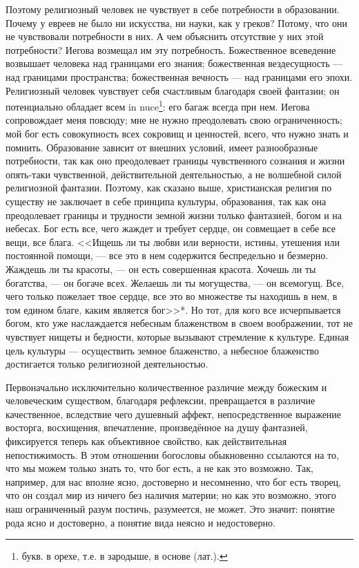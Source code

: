 \documentclass[12pt,oneside]{book}
\begin{document}
Поэтому религиозный человек не чувствует в себе потребности в образовании. Почему у евреев не было ни искусства, ни науки, как у греков? Потому, что они не чувствовали потребности в них. А чем объяснить отсутствие у них этой потребности? Иегова возмещал им эту потребность. Божественное всеведение возвышает человека над границами его знания\ddag\let\svthefootnote\thefootnote\let\thefootnote\relax{}\let\thefootnote\svthefootnote; божественная вездесущность --- над границами пространства; божественная вечность --- над границами его эпохи. Религиозный человек чувствует себя счастливым благодаря своей фантазии; он потенциально обладает всем in nuce\footnote{букв. в орехе, т.е. в зародыше, в основе (лат.).}: его багаж всегда при нем. Иегова сопровождает меня повсюду; мне не нужно преодолевать свою ограниченность; мой бог есть совокупность всех сокровищ и ценностей, всего, что нужно знать и помнить. Образование зависит от внешних условий, имеет разнообразные потребности, так как оно преодолевает границы чувственного сознания и жизни опять-таки чувственной, действительной деятельностью, а не волшебной силой религиозной фантазии. Поэтому, как сказано выше, христианская религия по существу не заключает в себе принципа культуры, образования, так как она преодолевает границы и трудности земной жизни только фантазией, богом и на небесах. Бог есть все, чего жаждет и требует сердце, он совмещает в себе все вещи, все блага. <<Ищешь ли ты любви или верности, истины, утешения или постоянной помощи, --- все это в нем содержится беспредельно и безмерно. Жаждешь ли ты красоты, --- он есть совершенная красота. Хочешь ли ты богатства, --- он богаче всех. Желаешь ли ты могущества, --- он всемогущ. Все, чего только пожелает твое сердце, все это во множестве ты находишь в нем, в том едином благе, каким является бог>>*\let\svthefootnote\thefootnote\let\thefootnote\relax{}\let\thefootnote\svthefootnote. Но тот, для кого все исчерпывается богом, кто уже наслаждается небесным блаженством в своем воображении, тот не чувствует нищеты и бедности, которые вызывают стремление к культуре. Единая цель культуры --- осуществить земное блаженство, а небесное блаженство достигается только религиозной деятельностью.



Первоначально исключительно количественное различие между божеским и человеческим существом, благодаря рефлексии, превращается в различие качественное, вследствие чего душевный аффект, непосредственное выражение восторга, восхищения, впечатление, произведённое на душу фантазией, фиксируется теперь как объективное свойство, как действительная непостижимость. В этом отношении богословы обыкновенно ссылаются на то, что мы можем только знать то, что бог есть, а не как это возможно. Так, например, для нас вполне ясно, достоверно и несомненно, что бог есть творец, что он создал мир из ничего без наличия материи; но как это возможно, этого наш ограниченный разум постичь, разумеется, не может. Это значит: понятие рода ясно и достоверно, а понятие вида неясно и недостоверно.
\end{document}
